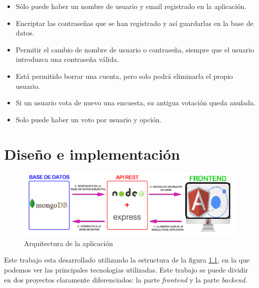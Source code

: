 \documentclass[a4paper, 12pt]{book}
\begin{document}
\begin{itemize}
 \item S\'olo puede haber un nombre de usuario y email registrado en la aplicaci\'on.
 \item Encriptar las contrase\~nas que se han registrado y as\'i guardarlas en la base de datos.
 \item Permitir el cambio de nombre de usuario o contrase\~na, siempre que el usuario introduzca una contrase\~na v\'alida.
 \item Est\'a permitido borrar una cuenta, pero solo podr\'a eliminarla el propio usuario.
 \item Si un usuario vota de nuevo una encuesta, su antigua votaci\'on queda anulada.
 \item Solo puede haber un voto por usuario y opci\'on.
 

\end{itemize}






\cleardoublepage
\chapter{Dise\~no e implementaci\'on}

\begin{figure}[H]
  \centering
  \includegraphics[width=14cm]{img/resumen.png}
  \caption{Arquitectura de la aplicaci\'on}
  \label{figura:frontend_backend}
\end{figure}


Este trabajo esta desarrollado utilizando la estructura de la figura \ref{figura:frontend_backend}, en la que podemos ver las principales tecnolog\'ias utilizadas. Este trabajo se puede
dividir en dos proyectos claramente diferenciados: la parte \emph{frontend} y la parte \emph{backend}\cite{FrontendBackend}.
\end{document}
